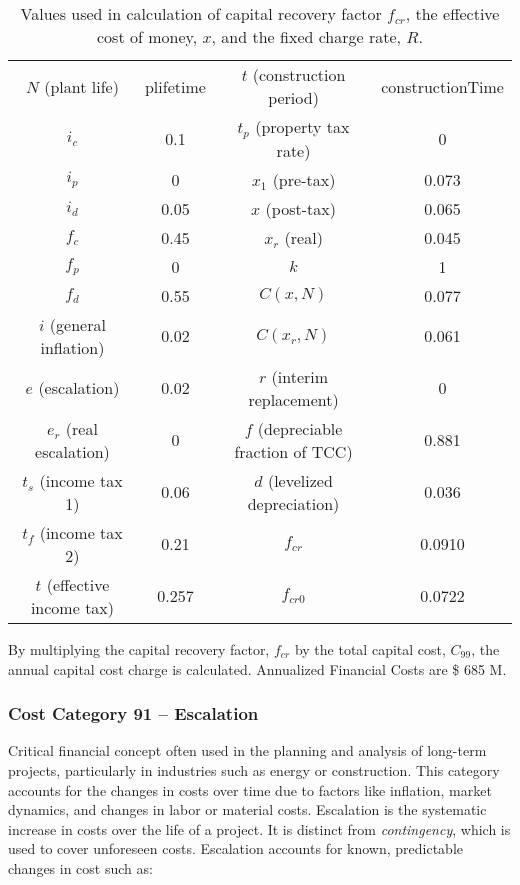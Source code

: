 \begin{table}
    \centering
    \begin{tabular}{cc|cc}
    \hline
      $N$ (plant life)  & plifetime & $t$ (construction period) & constructionTime\\
       $i_c$  & 0.1 & $t_p$ (property tax rate)& 0\\
        $i_p$ & 0 & $x_1$ (pre-tax)& 0.073\\
        $i_d$ & 0.05 & $x$ (post-tax)& 0.065\\
        $f_c$ & 0.45 & $x_r$ (real)& 0.045\\
        $f_p$ & 0 & $k$ & 1\\
        $f_d$ & 0.55 & $C(x,N)$ & 0.077\\
        $i$ (general inflation) & 0.02 & $C(x_r,N)$ & 0.061\\
        $e$  (escalation)& 0.02 & $r$ (interim replacement)& 0\\
        $e_r$ (real escalation) & 0 & $f$ (depreciable fraction of TCC)& 0.881\\
        $t_s$ (income tax 1) & 0.06 & $d$ (levelized depreciation)& 0.036\\
        $t_f$ (income tax 2) & 0.21 & $f_{cr}$ & 0.0910\\
        $t$ (effective income tax) & 0.257 & $f_{cr0}$ & 0.0722\\
    \hline    
    \end{tabular}
    \caption{Values used in calculation of capital recovery factor  $f_{cr}$, the effective cost of money, $x$, and the fixed charge rate, $R$.}
    \label{tab:ec_vals}
    \label{tab:my_label}
\end{table}

By multiplying the capital recovery factor, $f_{cr}$ by the total capital cost, $C_{99}$, the annual capital cost charge is calculated.
Annualized Financial Costs are \$ 685 M.

\subsubsection*{Cost Category 91 – Escalation}
Critical financial concept often used in the planning and analysis of long-term projects, particularly in industries such as energy or construction. This category accounts for the changes in costs over time due to factors like inflation, market dynamics, and changes in labor or material costs. Escalation is the systematic increase in costs over the life of a project. It is distinct from \textit{contingency}, which is used to cover unforeseen costs. Escalation accounts for known, predictable changes in cost such as:

